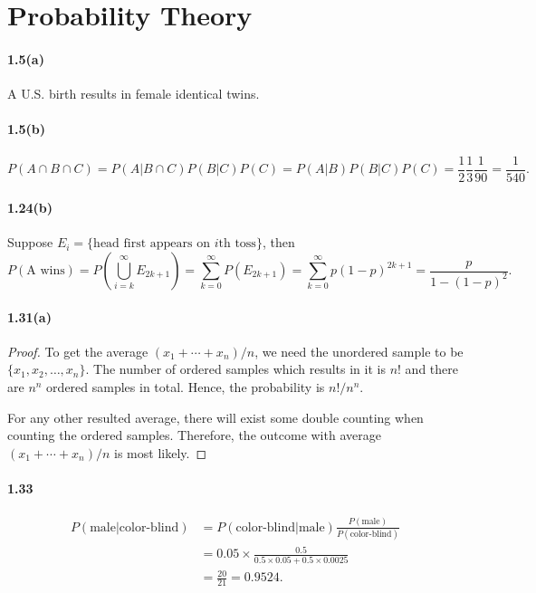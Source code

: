 \section{Probability Theory}

\paragraph{1.5(a)}
\begin{solution}
  A U.S. birth results in female identical twins.  
\end{solution}
\paragraph{1.5(b)}
\begin{solution}
  \[
    P(A\cap B\cap C) = 
    P(A|B\cap C)P(B|C)P(C) = 
    P(A|B)P(B|C)P(C) =
    \frac{1}{2}\frac{1}{3}\frac{1}{90}=\frac{1}{540}.
  \]
\end{solution}

\paragraph{1.24(b)}
\begin{solution}
  Suppose $E_i = \{\text{head first appears on $i$th toss}\}$, then
  \[
    P(\text{A wins}) = P(\bigcup_{i=k}^\infty E_{2k+1}) 
    = \sum_{k=0}^\infty P(E_{2k+1}) = \sum_{k=0}^\infty p(1-p)^{2k+1}
    = \frac{p}{1-(1-p)^2}.
  \]
\end{solution}

\paragraph{1.31(a)}
\begin{proof}
  To get the average $(x_1+\cdots+x_n)/n$, we need the unordered sample
  to be $\{x_1,x_2,\dots,x_n\}$. The number of ordered samples which results
  in it is $n!$ and there are $n^n$ ordered samples in total. Hence, the 
  probability is $n!/n^n$.\par
  For any other resulted average, there will exist some double counting when
  counting the ordered samples. Therefore, the outcome with average
  $(x_1+\cdots+x_n)/n$ is most likely.
\end{proof}

\paragraph{1.33}
\begin{solution}
  \[\begin{split}
    P(\text{male}|\text{color-blind}) &=
    P(\text{color-blind}|\text{male})\frac{P(\text{male})}{P(\text{color-blind})} \\
    &= 0.05\times \frac{0.5}{0.5\times 0.05 + 0.5\times 0.0025}  \\
    &= \frac{20}{21} = 0.9524.
  \end{split}\]
\end{solution}

